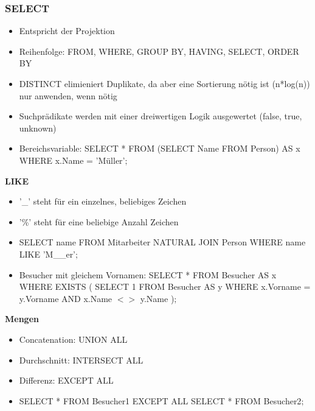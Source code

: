 \documentclass[8pt,a4paper]{scrartcl}
\begin{document}
\begin{multicols*}{3}
				\subsubsection{SELECT}
					\begin{itemize}\itemsep0pt		
						\item Entspricht der Projektion
						\item Reihenfolge: FROM, WHERE, GROUP BY, HAVING, SELECT, ORDER BY
						\item DISTINCT elimieniert Duplikate, da aber eine Sortierung nötig ist (n*log(n)) nur anwenden, wenn nötig
						\item Suchprädikate werden mit einer dreiwertigen Logik ausgewertet (false, true, unknown)
						\item Bereichsvariable: SELECT * FROM (SELECT Name FROM Person) AS x WHERE x.Name = 'Müller'$;$
					\end{itemize}	
						
					\textbf{LIKE}
						\begin{itemize}\itemsep0pt			
							\item '\_' steht für ein einzelnes, beliebiges Zeichen 
							\item '\%' steht für eine beliebige Anzahl Zeichen
							\item SELECT name FROM Mitarbeiter NATURAL JOIN Person WHERE name LIKE 'M\_\_er'$;$
							\item Besucher mit gleichem Vornamen: SELECT * FROM Besucher AS x WHERE EXISTS ( SELECT 1 FROM Besucher AS y WHERE x.Vorname = y.Vorname AND x.Name $<>$ y.Name )$;$
						\end{itemize}	
						
					\textbf{Mengen}
						\begin{itemize}\itemsep0pt			
							\item Concatenation: UNION ALL
							\item Durchschnitt: INTERSECT ALL
							\item Differenz: EXCEPT ALL
							\item SELECT * FROM Besucher1 EXCEPT ALL SELECT * FROM Besucher2$;$
						\end{itemize}	
						

\end{multicols*}
\end{document}
